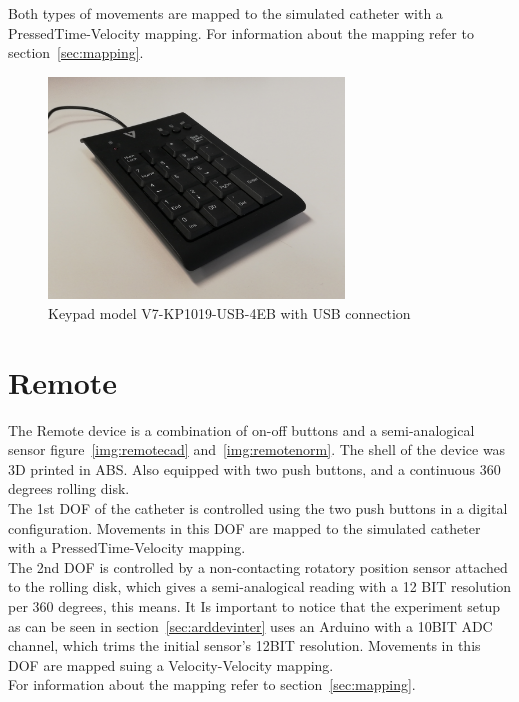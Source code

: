 Both types of movements are mapped to the simulated catheter with a PressedTime-Velocity mapping. For information about the mapping refer to section~\ref{sec:mapping}.\\

\begin{figure}[ht]
   \centering
   \includegraphics[width=0.7\textwidth]{img/keyboard.jpg}
   \caption{Keypad model V7-KP1019-USB-4EB with USB connection}
   \label{img:keyboardimg}
\end{figure}

\section{Remote}\label{sec:remote}
The Remote device is a combination of on-off buttons and a semi-analogical sensor figure~\ref{img:remotecad} and~\ref{img:remotenorm}. The shell of the device was 3D printed in ABS. Also equipped with two push buttons, and a continuous 360 degrees rolling disk.\\

The 1st DOF of the catheter is controlled using the two push buttons in a digital configuration. Movements in this DOF are mapped to the simulated catheter with a PressedTime-Velocity mapping.\\

The 2nd DOF is controlled by a non-contacting rotatory position sensor attached to the rolling disk, which gives a semi-analogical reading with a 12 BIT resolution per 360 degrees, this means. It Is important to notice that the experiment setup as can be seen in section~\ref{sec:arddevinter} uses an Arduino with a 10BIT ADC channel, which trims the initial sensor's 12BIT resolution. Movements in this DOF are mapped suing a Velocity-Velocity mapping.\\

For information about the mapping refer to section~\ref{sec:mapping}.\\

